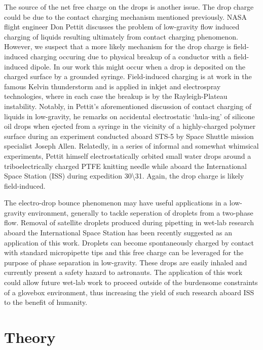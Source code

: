 \documentclass[aip,reprint, floatfix]{revtex4-1}
\begin{document}
The source of the net free charge on the drops is another issue. The drop charge could be due to the contact charging mechanism mentioned previously. NASA flight engineer Don Pettit discusses the problem of low-gravity flow induced charging of liquids resulting ultimately from contact charging phenomenon. \cite{pettit_donald_flow_1996} However, we suspect that a more likely mechanism for the drop charge is field-induced charging occuring due to physical breakup of a conductor with a field-induced dipole. In our work this might occur when a drop is deposited on the charged surface by a grounded syringe. Field-induced charging is at work in the famous Kelvin thunderstorm and is applied in inkjet and electrospray technologies, where in each case the breakup is by the Rayleigh-Plateau instability. Notably, in Pettit's aforementioned discussion of contact charging of liquids in low-gravity, he remarks on accidental electrostatic `hula-ing' of silicone oil drops when ejected from a syringe in the vicinity of a highly-charged polymer surface during an experiment conducted aboard STS-5 by Space Shuttle mission specialist Joseph Allen. \cite{pettit_donald_flow_1996} Relatedly, in a series of informal and somewhat whimsical experiments, Pettit himself electrostatically orbited small water drops around a triboelectrically charged PTFE knitting needle while aboard the International Space Station (ISS) during expedition 30\textbackslash 31. \cite{stevenson_electrostatic_2015} Again, the drop charge is likely field-induced.

The electro-drop bounce phenomenon may have useful applications in a low-gravity environment, generally to tackle seperation of droplets from a two-phase flow. Removal of satellite droplets produced during pipetting in wet-lab research aboard the International Space Station has been recently suggested as an application of this work. \cite{turner_mitigation_2019} Droplets can become spontaneously charged by contact with standard micropipette tips \citep{choi_spontaneous_2013} and this free charge can be leveraged for the purpose of phase separation in low-gravity. These drops are easily inhaled and currently present a safety hazard to astronauts. The application of this work could allow future wet-lab work to proceed outside of the burdensome constraints of a glovebox environment, thus increasing the yield of such research aboard ISS to the benefit of humanity.

\section{Theory}
\end{document}
